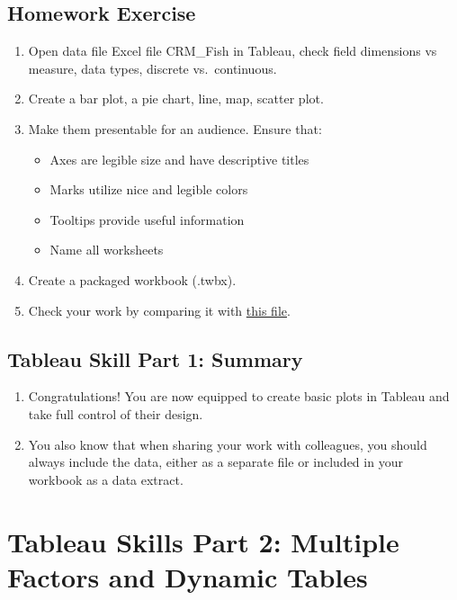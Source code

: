 \documentclass[
]{book}
\providecommand{\tightlist}{%
  \setlength{\itemsep}{0pt}\setlength{\parskip}{0pt}}
\begin{document}
\hypertarget{homework-exercise}{%
\subsection{Homework Exercise}\label{homework-exercise}}

\begin{enumerate}
\def\labelenumi{\arabic{enumi}.}
\tightlist
\item
  Open data file Excel file CRM\_Fish in Tableau, check field dimensions vs measure, data types, discrete vs.~continuous.
\item
  Create a bar plot, a pie chart, line, map, scatter plot.
\item
  Make them presentable for an audience. Ensure that:

  \begin{itemize}
  \tightlist
  \item
    Axes are legible size and have descriptive titles
  \item
    Marks utilize nice and legible colors
  \item
    Tooltips provide useful information
  \item
    Name all worksheets
  \end{itemize}
\item
  Create a packaged workbook (.twbx).
\item
  Check your work by comparing it with \href{files/M3S2_exercise_key.twbx}{this file}.
\end{enumerate}

\hypertarget{tableau-skill-part-1-summary}{%
\subsection{Tableau Skill Part 1: Summary}\label{tableau-skill-part-1-summary}}

\begin{enumerate}
\def\labelenumi{\arabic{enumi}.}
\tightlist
\item
  Congratulations! You are now equipped to create basic plots in Tableau and take full control of their design.
\item
  You also know that when sharing your work with colleagues, you should always include the data, either as a separate file or included in your workbook as a data extract.
\end{enumerate}

\hypertarget{tableau-skills-part-2-multiple-factors-and-dynamic-tables}{%
\section{Tableau Skills Part 2: Multiple Factors and Dynamic Tables}\label{tableau-skills-part-2-multiple-factors-and-dynamic-tables}}
\end{document}
